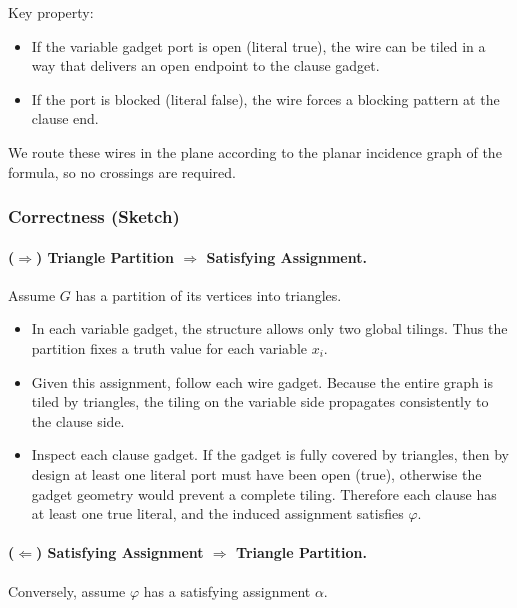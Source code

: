 \documentclass[9pt]{extarticle}
\begin{document}
Key property:
\begin{itemize}
    \item If the variable gadget port is open (literal true), the wire can be
          tiled in a way that delivers an open endpoint to the clause gadget.
    \item If the port is blocked (literal false), the wire forces a blocking
          pattern at the clause end.
\end{itemize}

We route these wires in the plane according to the planar incidence graph of
the formula, so no crossings are required.

\subsubsection*{Correctness (Sketch)}

\paragraph{($\Rightarrow$) Triangle Partition $\Rightarrow$ Satisfying Assignment.}

Assume $G$ has a partition of its vertices into triangles.

\begin{itemize}
    \item In each variable gadget, the structure allows only two global tilings.
          Thus the partition fixes a truth value for each variable $x_i$.
    \item Given this assignment, follow each wire gadget.  Because the entire
          graph is tiled by triangles, the tiling on the variable side
          propagates consistently to the clause side.
    \item Inspect each clause gadget.  If the gadget is fully covered by
          triangles, then by design at least one literal port must have been
          open (true), otherwise the gadget geometry would prevent a complete
          tiling.  Therefore each clause has at least one true literal, and the
          induced assignment satisfies $\varphi$.
\end{itemize}

\paragraph{($\Leftarrow$) Satisfying Assignment $\Rightarrow$ Triangle Partition.}

Conversely, assume $\varphi$ has a satisfying assignment $\alpha$.
\end{document}
